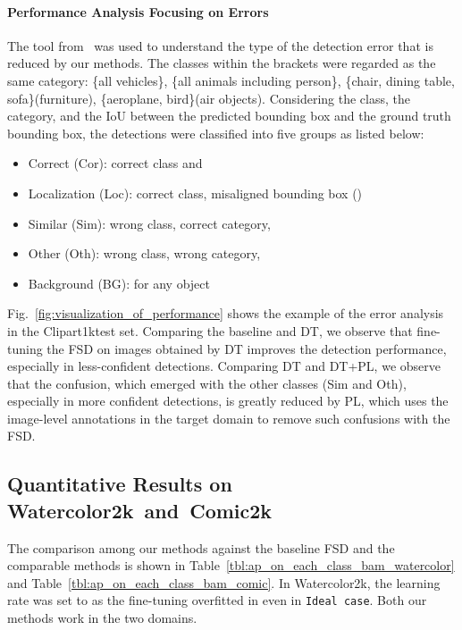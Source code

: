 \documentclass[10pt,twocolumn,letterpaper]{article}
\newcommand{\Tref}[1]{Table~\ref{#1}}
\newcommand{\Fref}[1]{Fig.~\ref{#1}}
\newcommand{\datasetclipart}{Clipart1k}
\newcommand{\datasetwatercolor}{Watercolor2k}
\newcommand{\datasetcomic}{Comic2k}
\begin{document}
\paragraph{Performance Analysis Focusing on Errors}
\label{subsec:performance_analysis}
The tool from~\cite{hoiem2012diagnosing} was used to understand the type of the detection error that is reduced by our methods.
The classes within the brackets were regarded as the same category: \{all vehicles\}, \{all animals including person\}, \{chair, dining table, sofa\}(furniture), \{aeroplane, bird\}(air objects).
Considering the class, the category, and the IoU between the predicted bounding box and the ground truth bounding box, the detections were classified into five groups as listed below:
\begin{itemize}[wide=0pt]
\setlength{\itemsep}{0cm}
    \item Correct (Cor): correct class and 
    \item Localization (Loc): correct class, misaligned bounding box ()
    \item Similar (Sim): wrong class, correct category, 
    \item Other (Oth): wrong class, wrong category, 
    \item Background (BG):  for any object
\end{itemize}
\Fref{fig:visualization_of_performance} shows the example of the error analysis in the \datasetclipart test set.
Comparing the baseline and DT, we observe that fine-tuning the FSD on images obtained by DT improves the detection performance, especially in less-confident detections.
Comparing DT and DT+PL, we observe that the confusion, which emerged with the other classes (Sim and Oth), especially in more confident detections, is greatly reduced by PL, which uses the image-level annotations in the target domain to remove such confusions with the FSD.

\subsection{Quantitative Results on \\ \datasetwatercolor~and~\datasetcomic}
\label{subsec:results_bam}
The comparison among our methods against the baseline FSD and the comparable methods is shown in \Tref{tbl:ap_on_each_class_bam_watercolor} and \Tref{tbl:ap_on_each_class_bam_comic}.
In \datasetwatercolor, the learning rate was set to  as the fine-tuning overfitted in  even in \texttt{Ideal case}.
Both our methods work in the two domains.
\end{document}
